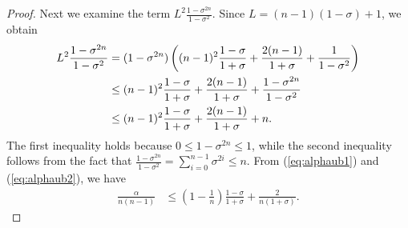 \documentclass{article}
\theoremstyle{plain}
\theoremstyle{definition}
\theoremstyle{remark}
\def\bigopen#1{\left(#1\right)}
\begin{document}
\begin{proof}
Next we examine the term $L^2 \frac{1-\sigma^{2n}}{1-\sigma^2}$. Since $L=(n-1)(1-\sigma)+1$, we obtain 
\begin{align}
    \label{eq:alphaub2}
    L^2 \frac{1-\sigma^{2n}}{1-\sigma^2} &= (1-\sigma^{2n})\bigopen{ (n-1)^2 \frac{1-\sigma}{1+\sigma} + \frac{2(n-1)}{1+\sigma} + \frac{1}{1-\sigma^2} } \notag \\
    &\le (n-1)^2 \frac{1-\sigma}{1+\sigma} + \frac{2(n-1)}{1+\sigma} + \frac{1-\sigma^{2n}}{1-\sigma^2} \notag \\
    &\le (n-1)^2 \frac{1-\sigma}{1+\sigma} + \frac{2(n-1)}{1+\sigma} + n.
\end{align}
The first inequality holds because $0\le 1-\sigma^{2n}\le 1$, while the second inequality follows from the fact that $\frac{1-\sigma^{2n}}{1-\sigma^2} = \sum_{i=0}^{n-1} \sigma^{2i} \le n$.
From (\ref{eq:alphaub1}) and (\ref{eq:alphaub2}), we have  
\begin{align}
    \frac{\alpha}{n(n-1)} &\le \bigopen{1-\frac{1}{n}} \frac{1-\sigma}{1+\sigma} + \frac{2}{n(1+\sigma)}. \label{eq:alphaub}
\end{align}


\end{proof}
\end{document}
